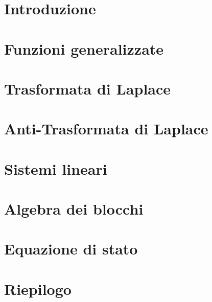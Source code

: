 \documentclass{report}
\begin{document}
	
	
	\tableofcontents
	\pagebreak
	\chapter{Introduzione}
		
	\pagebreak
	\chapter{Funzioni generalizzate}
	
	\pagebreak
	\chapter{Trasformata di Laplace}
	
	\pagebreak
	\chapter{Anti-Trasformata di Laplace}
	
	\pagebreak
	\chapter{Sistemi lineari}
	
	
	
	
	
	\pagebreak
	\chapter{Algebra dei blocchi}
	
	
	\pagebreak
	\chapter{Equazione di stato}
	
	
	\pagebreak
	\chapter{Riepilogo}
	
\end{document}
